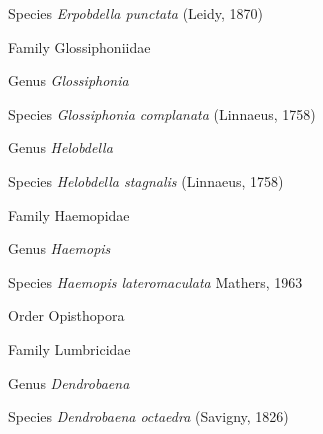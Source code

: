\documentclass[9pt, article]{memoir}
\begin{document}
\begin{multicols}{2}
\vspace{6pt}\noindent\hspace{36pt}Species \textit{Erpobdella punctata} (Leidy, 1870)


\vspace{6pt}\noindent\hspace{24pt}Family Glossiphoniidae


\vspace{6pt}\noindent\hspace{30pt}Genus \textit{Glossiphonia}


\vspace{6pt}\noindent\hspace{36pt}Species \textit{Glossiphonia complanata} (Linnaeus, 1758)


\vspace{6pt}\noindent\hspace{30pt}Genus \textit{Helobdella}


\vspace{6pt}\noindent\hspace{36pt}Species \textit{Helobdella stagnalis} (Linnaeus, 1758)


\vspace{6pt}\noindent\hspace{24pt}Family Haemopidae


\vspace{6pt}\noindent\hspace{30pt}Genus \textit{Haemopis}


\vspace{6pt}\noindent\hspace{36pt}Species \textit{Haemopis lateromaculata} Mathers, 1963


\vspace{6pt}\noindent\hspace{18pt}Order Opisthopora


\vspace{6pt}\noindent\hspace{24pt}Family Lumbricidae


\vspace{6pt}\noindent\hspace{30pt}Genus \textit{Dendrobaena}


\vspace{6pt}\noindent\hspace{36pt}Species \textit{Dendrobaena octaedra} (Savigny, 1826)



\end{multicols}
\end{document}
